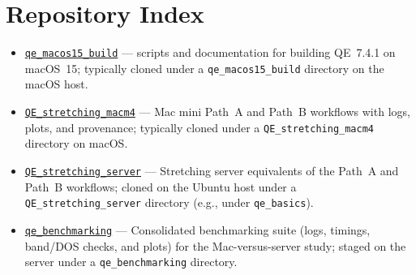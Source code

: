 \documentclass[12pt]{article}
\begin{document}
\section*{Repository Index}
\begin{itemize}
  \item \href{https://github.com/shahpoll/qe_macos15_build}{\texttt{qe\_macos15\_build}} — scripts and documentation for building QE~7.4.1 on macOS~15; typically cloned under a \texttt{qe\_macos15\_build} directory on the macOS host.
  \item \href{https://github.com/shahpoll/QE_stretching_macm4}{\texttt{QE\_stretching\_macm4}} — Mac mini Path~A and Path~B workflows with logs, plots, and provenance; typically cloned under a \texttt{QE\_stretching\_macm4} directory on macOS.
  \item \href{https://github.com/shahpoll/QE_stretching_server}{\texttt{QE\_stretching\_server}} — Stretching server equivalents of the Path~A and Path~B workflows; cloned on the Ubuntu host under a \texttt{QE\_stretching\_server} directory (e.g., under \texttt{qe\_basics}).
  \item \href{https://github.com/shahpoll/qe_benchmarking}{\texttt{qe\_benchmarking}} — Consolidated benchmarking suite (logs, timings, band/DOS checks, and plots) for the Mac-versus-server study; staged on the server under a \texttt{qe\_benchmarking} directory.
\end{itemize}
\end{document}
